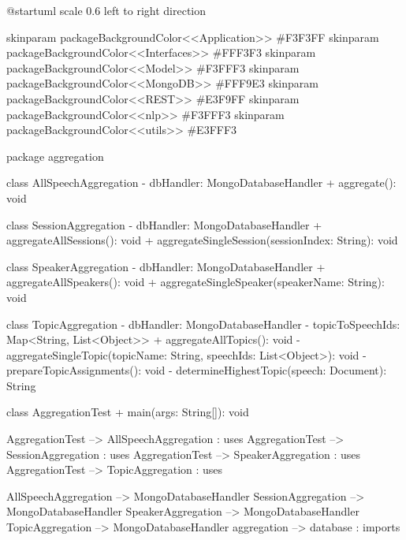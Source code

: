 

@startuml
scale 0.6
left to right direction

skinparam packageBackgroundColor<<Application>> #F3F3FF
skinparam packageBackgroundColor<<Interfaces>> #FFF3F3
skinparam packageBackgroundColor<<Model>> #F3FFF3
skinparam packageBackgroundColor<<MongoDB>> #FFF9E3
skinparam packageBackgroundColor<<REST>> #E3F9FF
skinparam packageBackgroundColor<<nlp>> #F3FFF3
skinparam packageBackgroundColor<<utils>> #E3FFF3

package aggregation {

  class AllSpeechAggregation {
    - dbHandler: MongoDatabaseHandler
    + aggregate(): void
  }

  class SessionAggregation {
    - dbHandler: MongoDatabaseHandler
    + aggregateAllSessions(): void
    + aggregateSingleSession(sessionIndex: String): void
  }

  class SpeakerAggregation {
    - dbHandler: MongoDatabaseHandler
    + aggregateAllSpeakers(): void
    + aggregateSingleSpeaker(speakerName: String): void
  }

  class TopicAggregation {
    - dbHandler: MongoDatabaseHandler
    - topicToSpeechIds: Map<String, List<Object>>
    + aggregateAllTopics(): void
    - aggregateSingleTopic(topicName: String, speechIds: List<Object>): void
    - prepareTopicAssignments(): void
    - determineHighestTopic(speech: Document): String
  }

  class AggregationTest {
    + main(args: String[]): void
  }

  AggregationTest --> AllSpeechAggregation : uses
  AggregationTest --> SessionAggregation : uses
  AggregationTest --> SpeakerAggregation : uses
  AggregationTest --> TopicAggregation : uses

  AllSpeechAggregation --> MongoDatabaseHandler
  SessionAggregation --> MongoDatabaseHandler
  SpeakerAggregation --> MongoDatabaseHandler
  TopicAggregation --> MongoDatabaseHandler
  aggregation --> database : imports

}

